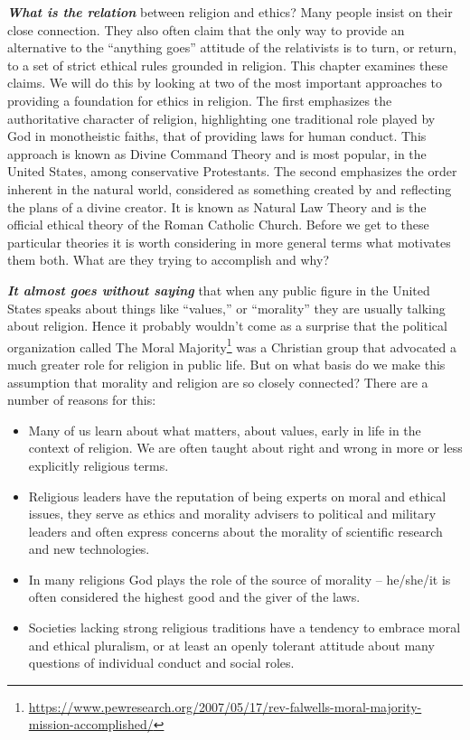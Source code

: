 \documentclass[
  12pt, openany]{book}
\providecommand{\tightlist}{%
  \setlength{\itemsep}{0pt}\setlength{\parskip}{0pt}}
\renewcommand{\href}[2]{#2\footnote{\url{#1}}}
\theoremstyle{definition}
\theoremstyle{definition}
\theoremstyle{definition}
\theoremstyle{remark}
\begin{document}
\textbf{\emph{What is the relation}} between religion and ethics? Many people insist on their close connection. They also often claim that the only way to provide an alternative to the ``anything goes'' attitude of the relativists is to turn, or return, to a set of strict ethical rules grounded in religion. This chapter examines these claims. We will do this by looking at two of the most important approaches to providing a foundation for ethics in religion. The first emphasizes the authoritative character of religion, highlighting one traditional role played by God in monotheistic faiths, that of providing laws for human conduct. This approach is known as Divine Command Theory and is most popular, in the United States, among conservative Protestants. The second emphasizes the order inherent in the natural world, considered as something created by and reflecting the plans of a divine creator. It is known as Natural Law Theory and is the official ethical theory of the Roman Catholic Church. Before we get to these particular theories it is worth considering in more general terms what motivates them both. What are they trying to accomplish and why?

\textbf{\emph{It almost goes without saying}} that when any public figure in the United States speaks about things like ``values,'' or ``morality'' they are usually talking about religion. Hence it probably wouldn't come as a surprise that the political organization called \href{https://www.pewresearch.org/2007/05/17/rev-falwells-moral-majority-mission-accomplished/}{The Moral Majority} was a Christian group that advocated a much greater role for religion in public life. But on what basis do we make this assumption that morality and religion are so closely connected? There are a number of reasons for this:

\begin{itemize}
\tightlist
\item
  Many of us learn about what matters, about values, early in life in the context of religion. We are often taught about right and wrong in more or less explicitly religious terms.
\item
  Religious leaders have the reputation of being experts on moral and ethical issues, they serve as ethics and morality advisers to political and military leaders and often express concerns about the morality of scientific research and new technologies.
\item
  In many religions God plays the role of the source of morality -- he/she/it is often considered the highest good and the giver of the laws.
\item
  Societies lacking strong religious traditions have a tendency to embrace moral and ethical pluralism, or at least an openly tolerant attitude about many questions of individual conduct and social roles.
\end{itemize}
\end{document}
